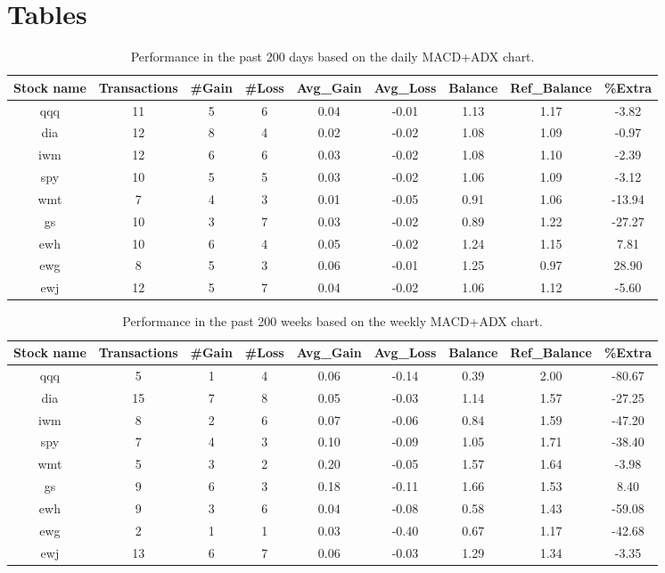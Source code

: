 \section{Tables}

\begin{table}[H]
\caption{Performance in the past 200 days based on the daily MACD+ADX chart.}
\label{tab:days}
\begin{center}
\begin{tabular}{ccccccccc}
Stock name & Transactions & \#Gain & \#Loss & Avg\_Gain & Avg\_Loss & Balance & Ref\_Balance & \%Extra\\
\hline
qqq&11&5&6&0.04&-0.01&1.13&1.17&-3.82\\
dia&12&8&4&0.02&-0.02&1.08&1.09&-0.97\\
iwm&12&6&6&0.03&-0.02&1.08&1.10&-2.39\\
spy&10&5&5&0.03&-0.02&1.06&1.09&-3.12\\
wmt&7&4&3&0.01&-0.05&0.91&1.06&-13.94\\
gs&10&3&7&0.03&-0.02&0.89&1.22&-27.27\\
ewh&10&6&4&0.05&-0.02&1.24&1.15&7.81\\
ewg&8&5&3&0.06&-0.01&1.25&0.97&28.90\\
ewj&12&5&7&0.04&-0.02&1.06&1.12&-5.60\\
\hline
\end{tabular}
\end{center}
\end{table}

\begin{table}[H]
\caption{Performance in the past 200 weeks based on the weekly MACD+ADX chart.}
\label{tab:weeks}
\begin{center}
\begin{tabular}{ccccccccc}
Stock name & Transactions & \#Gain & \#Loss & Avg\_Gain & Avg\_Loss & Balance & Ref\_Balance & \%Extra\\   
\hline
qqq&5&1&4&0.06&-0.14&0.39&2.00&-80.67\\
dia&15&7&8&0.05&-0.03&1.14&1.57&-27.25\\
iwm&8&2&6&0.07&-0.06&0.84&1.59&-47.20\\
spy&7&4&3&0.10&-0.09&1.05&1.71&-38.40\\
wmt&5&3&2&0.20&-0.05&1.57&1.64&-3.98\\
gs&9&6&3&0.18&-0.11&1.66&1.53&8.40\\
ewh&9&3&6&0.04&-0.08&0.58&1.43&-59.08\\
ewg&2&1&1&0.03&-0.40&0.67&1.17&-42.68\\
ewj&13&6&7&0.06&-0.03&1.29&1.34&-3.35\\
\hline
\end{tabular}
\end{center}
\end{table}

